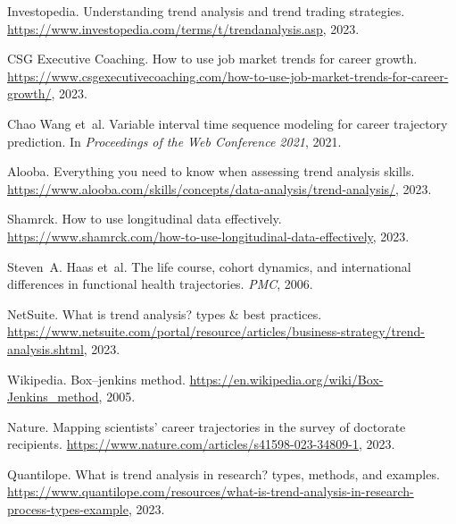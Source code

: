 \documentclass[../main.tex]{subfiles}
\begin{document}

\begin{thebibliography}{99}

Investopedia.
\newblock Understanding trend analysis and trend trading strategies.
\newblock \url{https://www.investopedia.com/terms/t/trendanalysis.asp}, 2023.

CSG Executive Coaching.
\newblock How to use job market trends for career growth.
\newblock \url{https://www.csgexecutivecoaching.com/how-to-use-job-market-trends-for-career-growth/}, 2023.

Chao Wang et~al.
\newblock Variable interval time sequence modeling for career trajectory prediction.
\newblock In \emph{Proceedings of the Web Conference 2021}, 2021.

Alooba.
\newblock Everything you need to know when assessing trend analysis skills.
\newblock \url{https://www.alooba.com/skills/concepts/data-analysis/trend-analysis/}, 2023.

Shamrck.
\newblock How to use longitudinal data effectively.
\newblock \url{https://www.shamrck.com/how-to-use-longitudinal-data-effectively}, 2023.

Steven~A. Haas et~al.
\newblock The life course, cohort dynamics, and international differences in functional health trajectories.
\newblock \emph{PMC}, 2006.

NetSuite.
\newblock What is trend analysis? types \& best practices.
\newblock \url{https://www.netsuite.com/portal/resource/articles/business-strategy/trend-analysis.shtml}, 2023.

Wikipedia.
\newblock Box--jenkins method.
\newblock \url{https://en.wikipedia.org/wiki/Box-Jenkins_method}, 2005.

Nature.
\newblock Mapping scientists' career trajectories in the survey of doctorate recipients.
\newblock \url{https://www.nature.com/articles/s41598-023-34809-1}, 2023.

Quantilope.
\newblock What is trend analysis in research? types, methods, and examples.
\newblock \url{https://www.quantilope.com/resources/what-is-trend-analysis-in-research-process-types-example}, 2023.


\end{thebibliography}
\end{document}
